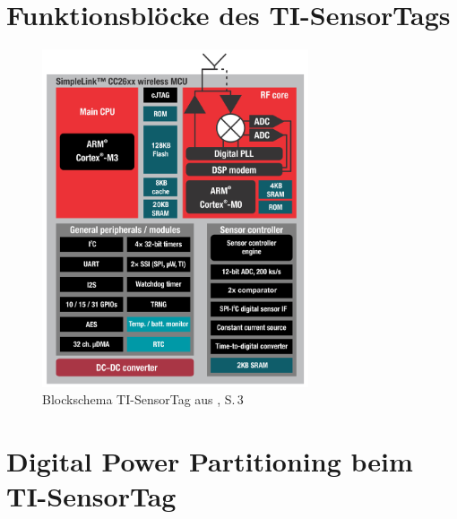 \chapter{Funktionsblöcke des TI-SensorTags}
\label{anhang_sensortag} 

\begin{figure}[h]
    \includegraphics [width=0.7\textwidth]{7Anhang/imag/CC26xx_Block_Diagram.png} 
     \caption{Blockschema TI-SensorTag aus \cite{Sensortag_Datasheet}, S.\,3}
\end{figure}


%


\chapter{Digital Power Partitioning beim TI-SensorTag}
\label{anhang_sensortag_PowerDomain} 

